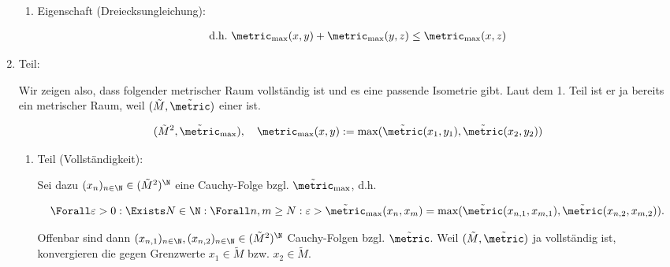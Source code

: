 \begin{solution}
\begin{enumerate}[label = \arabic*.]
\begin{enumerate}[label = \arabic*.]
        \item Eigenschaft (Dreiecksungleichung):
        
        \begin{align*}
            \text{d.h.}~
            \metric_{\max}(x, y)
            +
            \metric_{\max}(y, z)
            \leq
            \metric_{\max}(x, z)
        \end{align*}

    \end{enumerate}

    \item Teil:
    

    Wir zeigen also, dass folgender metrischer Raum vollständig ist und es eine passende Isometrie gibt.
    Laut dem 1. Teil ist er ja bereits ein metrischer Raum, weil $(\tilde M, \tilde \metric)$ einer ist.

    \begin{align*}
        (\tilde M^2, \tilde \metric_{\max}),
        \quad
        \metric_{\max}(x, y)
        :=
        \max
        (
            \tilde \metric(x_1, y_1),
            \tilde \metric(x_2, y_2)
        )
    \end{align*}

    \begin{enumerate}[label = 2.\arabic*.]

        \item Teil (Vollständigkeit):
        
        Sei dazu $(x_n)_{n \in \N} \in (\tilde M^2)^\N$ eine Cauchy-Folge bzgl. $\tilde \metric_{\max}$, d.h.

        \begin{align*}
            \Forall \varepsilon > 0:
            \Exists N \in \N:
            \Forall n, m \geq N:
            \varepsilon
            >
            \tilde \metric_{\max}(x_n, x_m)
            =
            \max
            (
                \tilde \metric(x_{n, 1}, x_{m, 1}),
                \tilde \metric(x_{n, 2}, x_{m, 2})
            ).
        \end{align*}

        Offenbar sind dann $(x_{n, 1})_{n \in \N}, (x_{n, 2})_{n \in \N} \in (\tilde M^2)^\N$ Cauchy-Folgen bzgl. $\tilde \metric$.
        Weil $(\tilde M, \tilde \metric)$ ja vollständig ist, konvergieren die gegen Grenzwerte $x_1 \in \tilde M$ bzw. $x_2 \in \tilde M$.


\end{enumerate}
\end{enumerate}
\end{solution}
